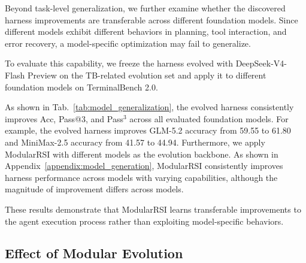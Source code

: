 \documentclass{article} %
\begin{document}
Beyond task-level generalization, we further examine whether the discovered harness improvements are transferable across different foundation models. Since different models exhibit different behaviors in planning, tool interaction, and error recovery, a model-specific optimization may fail to generalize.

To evaluate this capability, we freeze the harness evolved with DeepSeek-V4-Flash Preview on the TB-related evolution set and apply it to different foundation models on TerminalBench 2.0.

As shown in Tab.~\ref{tab:model_generalization}, the evolved harness consistently improves Acc, Pass@3, and Pass$^{3}$ across all evaluated foundation models. For example, the evolved harness improves GLM-5.2 accuracy from 59.55 to 61.80 and MiniMax-2.5 accuracy from 41.57 to 44.94. 
Furthermore, we apply ModularRSI with different models as the evolution backbone. As shown in Appendix~\ref{appendix:model_generation}, ModularRSI consistently improves harness performance across models with varying capabilities, although the magnitude of improvement differs across models.


These results demonstrate that ModularRSI learns transferable improvements to the agent execution process rather than exploiting model-specific behaviors.



\subsection{Effect of Modular Evolution}
\label{subsec:effect_modular_evolution}





\end{document}
